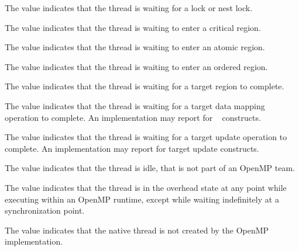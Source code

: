 The value  indicates that the thread is waiting 
for a  lock or nest lock. 

The value  indicates that the thread is 
waiting to enter a critical region. 

The value  indicates that the thread is 
waiting to enter an atomic region. 

The value  indicates that the thread is 
waiting to enter an ordered region. 

The value  indicates that the thread is 
waiting for a target region to complete.

The value  indicates that the thread is 
waiting for a target data mapping operation to complete. An implementation may 
report  for ~ constructs.

The value  indicates that the thread 
is waiting for a target  update operation to complete. An implementation 
may report  for target update constructs.

The value  indicates that the thread is idle, that 
is not part of an OpenMP team.

The value  indicates that the thread is in the 
overhead state at any point while executing within an OpenMP runtime, 
except while waiting indefinitely at a synchronization point.

The value  indicates that the native thread is 
not created by the OpenMP implementation.

